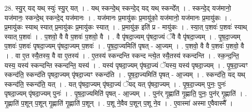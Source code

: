 \documentclass[17pt]{extarticle}
\begin{document}
28. स्यु॒र् यद् यथ् स्युः॑ स्यु॒र् यत् । . यथ् स्कन्दे॒थ् स्कन्दे॒द् यद् यथ् स्कन्दे᳚त् । . स्कन्दे॒द् यज॑मानो॒ यज॑मानः॒ स्कन्दे॒थ् स्कन्दे॒द् यज॑मानः । . यज॑मानः प्र॒मायु॑कः प्र॒मायु॑को॒ यज॑मानो॒ यज॑मानः प्र॒मायु॑कः । . प्र॒मायु॑कः स्याथ् स्यात् प्र॒मायु॑कः प्र॒मायु॑कः स्यात् । . प्र॒मायु॑क॒ इति॑ प्र - मायु॑कः । . स्या॒त् प॒शवः॑ प॒शवः॑ स्याथ् स्यात् प॒शवः॑ । . प॒शवो॒ वै वै प॒शवः॑ प॒शवो॒ वै । . वै पृ॑षदा॒ज्यम् पृ॑षदा॒ज्यं ॅवै वै पृ॑षदा॒ज्यम् । . पृ॒ष॒दा॒ज्यम् प॒शवः॑ प॒शवः॑ पृषदा॒ज्यम् पृ॑षदा॒ज्यम् प॒शवः॑ । . पृ॒ष॒दा॒ज्यमिति॑ पृषत् - आ॒ज्यम् । . प॒शवो॒ वै वै प॒शवः॑ प॒शवो॒ वै । . वा ए॒त स्यै॒तस्य॒ वै वा ए॒तस्य॑ । . ए॒तस्य॑ स्कन्दन्ति स्कन्द न्त्ये॒त स्यै॒तस्य॑ स्कन्दन्ति । . स्क॒न्द॒न्ति॒ यस्य॒ यस्य॑ स्कन्दन्ति स्कन्दन्ति॒ यस्य॑ । . यस्य॑ पृषदा॒ज्यम् पृ॑षदा॒ज्यं ॅयस्य॒ यस्य॑ पृषदा॒ज्यम् । . पृ॒ष॒दा॒ज्यꣳ स्कन्द॑ति॒ स्कन्द॑ति पृषदा॒ज्यम् पृ॑षदा॒ज्यꣳ स्कन्द॑ति । . पृ॒ष॒दा॒ज्यमिति॑ पृषत् - आ॒ज्यम् । . स्कन्द॑ति॒ यद् यथ् स्कन्द॑ति॒ स्कन्द॑ति॒ यत् । . यत् पृ॑षदा॒ज्यम् पृ॑षदा॒ज्यं ॅयद् यत् पृ॑षदा॒ज्यम् । . पृ॒ष॒दा॒ज्यम् पुनः॒ पुनः॑ पृषदा॒ज्यम् पृ॑षदा॒ज्यम् पुनः॑ । . पृ॒ष॒दा॒ज्यमिति॑ पृषत् - आ॒ज्यम् । . पुन॑र् गृ॒ह्णाति॑ गृ॒ह्णाति॒ पुनः॒ पुन॑र् गृ॒ह्णाति॑ । . गृ॒ह्णाति॑ प॒शून् प॒शून् गृ॒ह्णाति॑ गृ॒ह्णाति॑ प॒शून् । . प॒शू ने॒वैव प॒शून् प॒शू ने॒व । . ए॒वास्मा॑ अस्मा ए॒वैवास्मै᳚ । \newline
\end{document}
